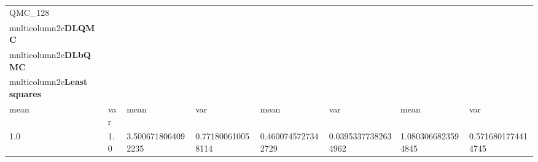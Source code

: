 \begin{tabular}{llllllll}
\toprule
 QMC\_128 & \\multicolumn{2}{c}{\textbf{DLQMC}} & \\multicolumn{2}{c}{\textbf{DLbQMC}}             & \\multicolumn{2}{c}{\textbf{Least squares}}     &                    &                     &                    &                    \\
 mean    & var   & mean               & var               & mean               & var                 & mean               & var                \\
 1.0     & 1.0   & 3.5006718064092235 & 0.771800610058114 & 0.4600745727342729 & 0.03953377382634962 & 1.0803066823594845 & 0.5716801774414745 \\
\bottomrule
\end{tabular}%

